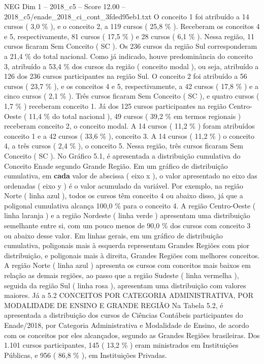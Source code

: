 \begin{textsample}{NEG Dim 1 – 2018\_c5 – Score 12.00 – 2018\_c5/enade\_2018\_ci\_cont\_3fded95eb1.txt}
O conceito 1 foi atribuído a 14 cursos ( 3,0 \% ), e o conceito 2, a 119 cursos ( 25,8 \% ).
Receberam os conceitos 4 e 5, respectivamente, 81 cursos ( 17,5 \% ) e 28 cursos ( 6,1 \% ).
Nessa região, 11 cursos ficaram Sem Conceito ( SC ).
Os 236 cursos da região Sul corresponderam a 21,4 \% do total nacional.
Como já indicado, houve predominância do conceito 3, atribuído a 53,4 \% dos cursos da região ( conceito modal ), ou seja, atribuído a 126 dos 236 cursos participantes na região Sul.
O conceito 2 foi atribuído a 56 cursos ( 23,7 \% ), e os conceitos 4 e 5, respectivamente, a 42 cursos ( 17,8 \% ) e a cinco cursos ( 2,1 \% ).
Três cursos ficaram Sem Conceito ( SC ), e quatro cursos ( 1,7 \% ) receberam conceito 1.
Já dos 125 cursos participantes na região Centro-Oeste ( 11,4 \% do total nacional ), 49 cursos ( 39,2 \% em termos regionais ) receberam conceito 2, o conceito modal.
A 14 cursos ( 11,2 \% ) foram atribuídos conceito 1 e a 42 cursos ( 33,6 \% ), conceito 3.
A 14 cursos ( 11,2 \% ) o conceito 4, a três cursos ( 2,4 \% ), o conceito 5.
Nessa região, três cursos ficaram Sem Conceito ( SC ).
No Gráfico 5.1, é apresentada a distribuição cumulativa do Conceito Enade segundo Grande Região.
Em um gráfico de distribuição cumulativa, em \textbf{cada} valor de abscissa ( eixo x ), o valor apresentado no eixo das ordenadas ( eixo y ) é o valor acumulado da variável.
Por exemplo, na região Norte ( linha azul ), todos os cursos têm conceito 4 ou abaixo disso, já que a poligonal cumulativa alcança 100,0 \% para o conceito 4.
A região Centro-Oeste ( linha laranja ) e a região Nordeste ( linha verde ) apresentam uma distribuição semelhante entre si, com um pouco menos de 90,0 \% dos cursos com conceito 3 ou abaixo desse valor.
Em linhas gerais, em um gráfico de distribuição cumulativa, poligonais mais à esquerda representam Grandes Regiões com pior distribuição, e poligonais mais à direita, Grandes Regiões com melhores conceitos.
A região Norte ( linha azul ) apresenta os cursos com conceitos mais baixos em relação as demais regiões, ao passo que a região Sudeste ( linha vermelha ), seguida da região Sul ( linha rosa ), apresentam uma distribuição com valores maiores.
Já a 5.2 CONCEITOS POR CATEGORIA ADMINISTRATIVA, POR MODALIDADE DE ENSINO E GRANDE REGIÃO Na Tabela 5.2, é apresentada a distribuição dos cursos de Ciências Contábeis participantes do Enade/2018, por Categoria Administrativa e Modalidade de Ensino, de acordo com os conceitos por eles alcançados, segundo as Grandes Regiões brasileiras.
Dos 1.101 cursos participantes, 145 ( 13,2 \% ) eram ministrados em Instituições Públicas, e 956 ( 86,8 \% ), em Instituições Privadas.

\end{textsample}
